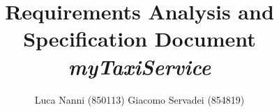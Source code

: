 \documentclass[a4paper]{report}
\begin{document}
\title{Requirements Analysis and Specification Document\linebreak
		\linebreak
		{\Huge\textit{\textbf{myTaxiService}}}
		}
\author{Luca Nanni (850113) \linebreak
	Giacomo Servadei (854819)}
\maketitle

\tableofcontents
\listoffigures
\listoftables





\end{document}
